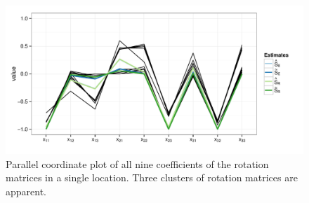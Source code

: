 \begin{figure}[htbp] %
   \centering
   \includegraphics[width=.7\textwidth]{images/pcp.pdf} 
   \caption{ \label{fig:pcp}Parallel coordinate plot of all nine coefficients of the rotation matrices in a single location. Three clusters of rotation matrices are apparent.  }
\end{figure}




